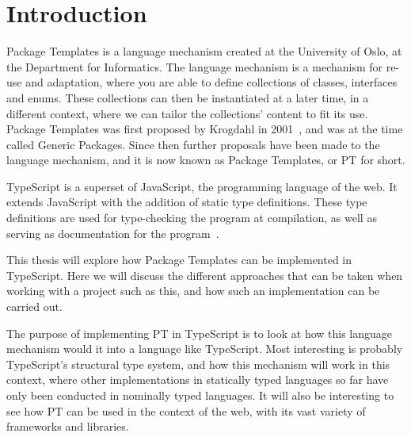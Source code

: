 
\chapter{Introduction}\label{ch:introduction}



Package Templates is a language mechanism created at the University of Oslo, at the Department for Informatics.
The language mechanism is a mechanism for re-use and adaptation, where you are able to define collections of classes, interfaces and enums.
These collections can then be instantiated at a later time, in a different context, where we can tailor the collections' content to fit its use.
Package Templates was first proposed by Krogdahl in 2001~\cite{krogdahl:GP}, and was at the time called Generic Packages.
Since then further proposals have been made to the language mechanism, and it is now known as Package Templates, or PT for short.

TypeScript is a superset of JavaScript, the programming language of the web.
It extends JavaScript with the addition of static type definitions.
These type definitions are used for type-checking the program at compilation, as well as serving as documentation for the program~\cite{tswebsite}.

This thesis will explore how Package Templates can be implemented in TypeScript.
Here we will discuss the different approaches that can be taken when working with a project such as this, and how such an implementation can be carried out.

The purpose of implementing PT in TypeScript is to look at how this language mechanism would it into a language like TypeScript.
Most interesting is probably TypeScript's structural type system, and how this mechanism will work in this context, where other implementations in statically typed languages so far have only been conducted in nominally typed languages.
It will also be interesting to see how PT can be used in the context of the web, with its vast variety of frameworks and libraries.

